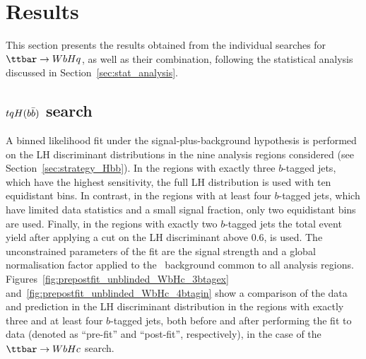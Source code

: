 \section{Results}
\label{sec:result}

This section presents the results obtained from the individual searches for $\Hq$, as well as their combination,
following the statistical analysis discussed in Section~\ref{sec:stat_analysis}.

\subsection{$tqH(b\bar{b})$ search}
\label{sec:results_Hbb}

A binned likelihood fit under the signal-plus-background hypothesis 
is performed on the LH discriminant distributions in the nine analysis regions considered (see Section~\ref{sec:strategy_Hbb}).
In the regions with exactly three $b$-tagged jets, which have the highest sensitivity, the full LH distribution is used with ten equidistant bins. 
In contrast, in the regions with at least four $b$-tagged jets,
which have limited data statistics and a small signal fraction, only two equidistant bins are used. Finally, in the regions with exactly two $b$-tagged jets 
the total event yield after applying a cut on the LH discriminant above 0.6, is used. 
The unconstrained parameters of the fit are the signal strength and a global normalisation factor applied to the \ttbin\ background 
common to all analysis regions.
Figures~\ref{fig:prepostfit_unblinded_WbHc_3btagex} and~\ref{fig:prepostfit_unblinded_WbHc_4btagin} show a comparison 
of the data and prediction in the LH discriminant distribution in the regions with exactly three and at least four $b$-tagged jets, 
both before and after performing the fit to data (denoted as ``pre-fit'' and ``post-fit'', respectively), in the case of the $\Hc$ search.  

